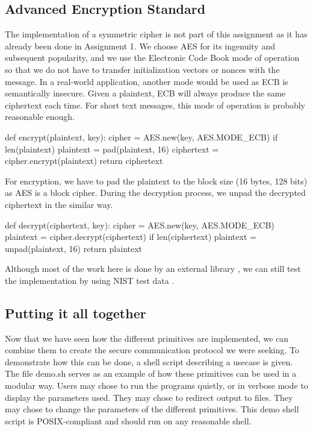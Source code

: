 \documentclass{article}
\begin{document}
\subsection{Advanced Encryption Standard}

The implementation of a symmetric cipher is not part of this assignment as it has already been done in Assignment 1. We choose AES for its ingenuity and subsequent popularity, and we use the Electronic Code Book mode of operation so that we do not have to transfer initialization vectors or nonces with the message. In a real-world application, another mode would be used as ECB is semantically insecure. Given a plaintext, ECB will always produce the same ciphertext each time. For short text messages, this mode of operation is probably reasonable enough.
  
\bigskip
\begin{python}
def encrypt(plaintext, key):
    cipher = AES.new(key, AES.MODE_ECB)
    if len(plaintext) %
        plaintext = pad(plaintext, 16)
    ciphertext = cipher.encrypt(plaintext)
    return ciphertext
\end{python}
\bigskip

For encryption, we have to pad the plaintext to the block size (16 bytes, 128 bits) as AES is a block cipher. During the decryption process, we unpad the decrypted ciphertext in the similar way. 

\bigskip
\begin{python}
def decrypt(ciphertext, key):
    cipher = AES.new(key, AES.MODE_ECB)
    plaintext = cipher.decrypt(ciphertext)
    if len(ciphertext) %
        plaintext = unpad(plaintext, 16)
    return plaintext
\end{python}
\bigskip

Although most of the work here is done by an external library \cite{pycryptodome}, we can still test the implementation by using NIST test data \cite{nist:test}.

\subsection{Putting it all together}

Now that we have seen how the different primitives are implemented, we can combine them to create the secure communication protocol we were seeking. To demonstrate how this can be done, a shell script describing a usecase is given. The file demo.sh serves as an example of how these primitives can be used in a modular way. Users may chose to run the programs quietly, or in verbose mode to display the parameters used. They may chose to redirect output to files. They may chose to change the parameters of the different primitives. This demo shell script is POSIX-compliant and should run on any reasonable shell. 
  
\end{document}
